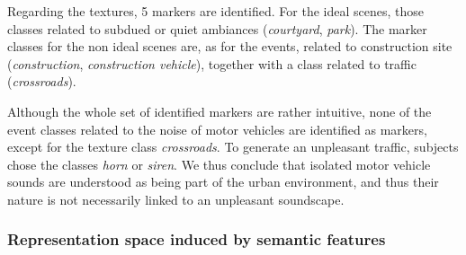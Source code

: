 \documentclass[12pt]{elsarticle}
\begin{document}

Regarding the textures, 5 markers are identified. For the ideal scenes, those classes related to subdued or quiet ambiances (\emph{courtyard}, \emph{park}). The marker classes for the non ideal scenes are, as for the events, related to construction site (\emph{construction}, \emph{construction vehicle}), together with a class related to traffic (\emph{crossroads}).


Although the whole set of identified markers are rather intuitive, none of the event classes related to the noise of motor vehicles are identified as markers, except for the texture class \emph{crossroads}. To generate an unpleasant traffic, subjects chose the classes \emph{horn} or \emph{siren}. We thus conclude that isolated motor vehicle sounds are understood as being part of the urban environment, and thus their nature is not necessarily linked to an unpleasant soundscape.

\subsubsection*{Representation space induced by semantic features}
\end{document}
